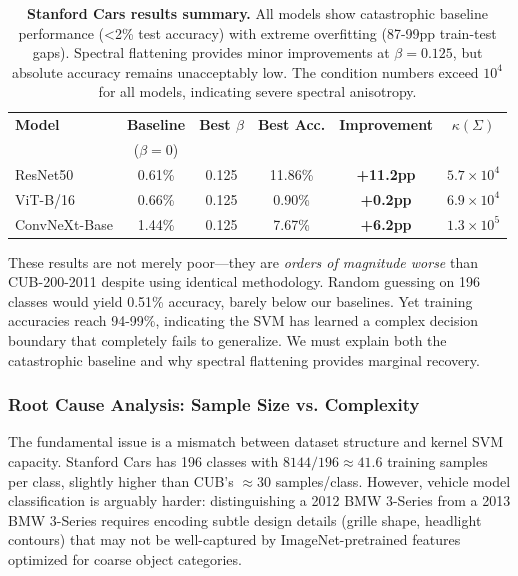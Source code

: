 \documentclass[11pt]{article}
\begin{document}
\begin{table}[h]
\centering
\caption{\textbf{Stanford Cars results summary.} All models show catastrophic baseline performance (<2\% test accuracy) with extreme overfitting (87-99pp train-test gaps). Spectral flattening provides minor improvements at $\beta=0.125$, but absolute accuracy remains unacceptably low. The condition numbers exceed $10^4$ for all models, indicating severe spectral anisotropy.}
\label{tab:cars_results}
\begin{tabular}{lccccc}
\toprule
\textbf{Model} & \textbf{Baseline} & \textbf{Best $\beta$} & \textbf{Best Acc.} & \textbf{Improvement} & \textbf{$\kappa(\Sigma)$} \\
 & ($\beta=0$) & & & & \\
\midrule
ResNet50 & 0.61\% & 0.125 & 11.86\% & \textbf{+11.2pp} & $5.7 \times 10^4$ \\
ViT-B/16 & 0.66\% & 0.125 & 0.90\% & \textbf{+0.2pp} & $6.9 \times 10^4$ \\
ConvNeXt-Base & 1.44\% & 0.125 & 7.67\% & \textbf{+6.2pp} & $1.3 \times 10^5$ \\
\bottomrule
\end{tabular}
\end{table}

These results are not merely poor---they are \emph{orders of magnitude worse} than CUB-200-2011 despite using identical methodology. Random guessing on 196 classes would yield 0.51\% accuracy, barely below our baselines. Yet training accuracies reach 94-99\%, indicating the SVM has learned a complex decision boundary that completely fails to generalize. We must explain both the catastrophic baseline and why spectral flattening provides marginal recovery.

\subsubsection{Root Cause Analysis: Sample Size vs. Complexity}

The fundamental issue is a mismatch between dataset structure and kernel SVM capacity. Stanford Cars has 196 classes with $8144 / 196 \approx 41.6$ training samples per class, slightly higher than CUB's $\approx 30$ samples/class. However, vehicle model classification is arguably harder: distinguishing a 2012 BMW 3-Series from a 2013 BMW 3-Series requires encoding subtle design details (grille shape, headlight contours) that may not be well-captured by ImageNet-pretrained features optimized for coarse object categories.
\end{document}
